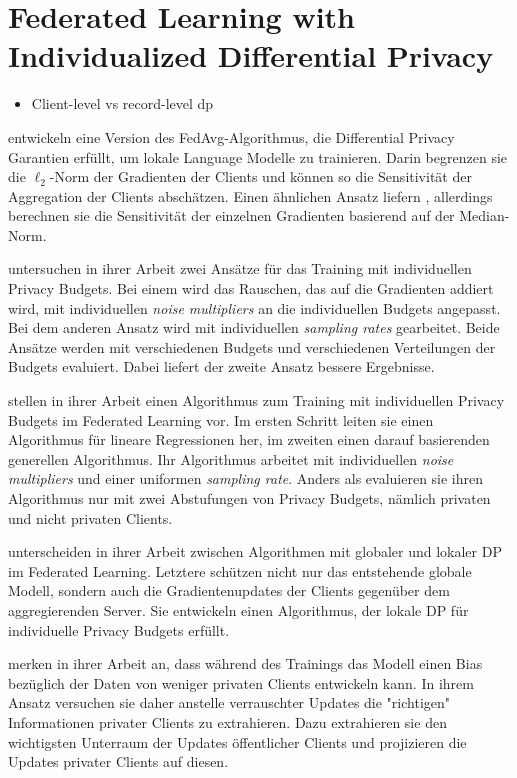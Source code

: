 \section{Federated Learning with Individualized Differential Privacy}\label{sec:rw-flidp}

\begin{itemize}
	\item Client-level vs record-level dp
\end{itemize}

\textcite{mcmahan:2018} entwickeln eine Version des FedAvg-Algorithmus, die Differential Privacy Garantien erfüllt, um lokale Language Modelle zu trainieren. Darin begrenzen sie die $\ell_2$-Norm der Gradienten der Clients und können so die Sensitivität der Aggregation der Clients abschätzen. Einen ähnlichen Ansatz liefern \textcite{geyer:2017}, allerdings berechnen sie die Sensitivität der einzelnen Gradienten basierend auf der Median-Norm.

\textcite{boenisch:2023} untersuchen in ihrer Arbeit zwei Ansätze für das Training mit individuellen Privacy Budgets. Bei einem wird das Rauschen, das auf die Gradienten addiert wird, mit individuellen \textit{noise multipliers} an die individuellen Budgets angepasst. Bei dem anderen Ansatz wird mit individuellen \textit{sampling rates} gearbeitet. Beide Ansätze werden mit verschiedenen Budgets und verschiedenen Verteilungen der Budgets evaluiert. Dabei liefert der zweite Ansatz bessere Ergebnisse.

\textcite{aldaghri:2023} stellen in ihrer Arbeit einen Algorithmus zum Training mit individuellen Privacy Budgets im Federated Learning vor. Im ersten Schritt leiten sie einen Algorithmus für lineare Regressionen her, im zweiten einen darauf basierenden generellen Algorithmus. Ihr Algorithmus arbeitet mit individuellen \textit{noise multipliers} und einer uniformen \textit{sampling rate}. Anders als \citeauthor{boenisch:2023} evaluieren sie ihren Algorithmus nur mit zwei Abstufungen von Privacy Budgets, nämlich privaten und nicht privaten Clients.

\textcite{yang:2021} unterscheiden in ihrer Arbeit zwischen Algorithmen mit globaler und lokaler DP im Federated Learning. Letztere schützen nicht nur das entstehende globale Modell, sondern auch die Gradientenupdates der Clients gegenüber dem aggregierenden Server. Sie entwickeln einen Algorithmus, der lokale DP für individuelle Privacy Budgets erfüllt.

\textcite{liu:2021} merken in ihrer Arbeit an, dass während des Trainings das Modell einen Bias bezüglich der Daten von weniger privaten Clients entwickeln kann. In ihrem Ansatz versuchen sie daher anstelle verrauschter Updates die "richtigen" Informationen privater Clients zu extrahieren. Dazu extrahieren sie den wichtigsten Unterraum der Updates öffentlicher Clients und projizieren die Updates privater Clients auf diesen.

